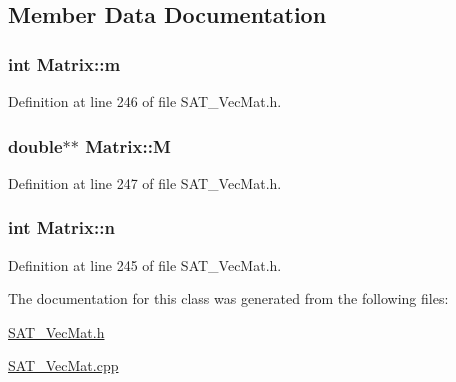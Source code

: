 \subsection{Member Data Documentation}
\hypertarget{classMatrix_af5435c7814eef8c12549d34e7be2184c}{
\subsubsection[{m}]{\setlength{\rightskip}{0pt plus 5cm}int Matrix\-::m\hspace{0.3cm}{\ttfamily [private]}}}\label{classMatrix_af5435c7814eef8c12549d34e7be2184c}


Definition at line 246 of file S\-A\-T\-\_\-\-Vec\-Mat.\-h.

\hypertarget{classMatrix_a6809ed961617c63dfdea6ca953990b8f}{
\subsubsection[{M}]{\setlength{\rightskip}{0pt plus 5cm}double$\ast$$\ast$ Matrix\-::\-M\hspace{0.3cm}{\ttfamily [private]}}}\label{classMatrix_a6809ed961617c63dfdea6ca953990b8f}


Definition at line 247 of file S\-A\-T\-\_\-\-Vec\-Mat.\-h.

\hypertarget{classMatrix_a6f755dbfbefb9b4ba6c2b3acea8932f2}{
\subsubsection[{n}]{\setlength{\rightskip}{0pt plus 5cm}int Matrix\-::n\hspace{0.3cm}{\ttfamily [private]}}}\label{classMatrix_a6f755dbfbefb9b4ba6c2b3acea8932f2}


Definition at line 245 of file S\-A\-T\-\_\-\-Vec\-Mat.\-h.



The documentation for this class was generated from the following files\-:\begin{DoxyCompactItemize}
\item 
\hyperlink{SAT__VecMat_8h}{S\-A\-T\-\_\-\-Vec\-Mat.\-h}\item 
\hyperlink{SAT__VecMat_8cpp}{S\-A\-T\-\_\-\-Vec\-Mat.\-cpp}\end{DoxyCompactItemize}
